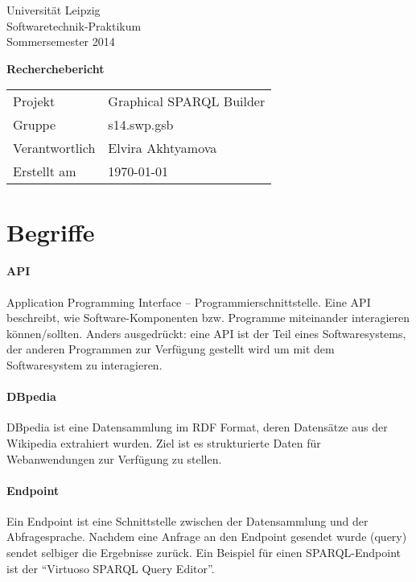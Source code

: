 \def\verantwortlicher{Elvira Akhtyamova} %
\thispagestyle{empty} 

\vspace*{2\baselineskip}

\begin{center}
\sffamily
Universität Leipzig\\
Softwaretechnik-Praktikum\\
Sommersemester 2014
\baselineskip

\bgroup
\Huge\textbf{Recherchebericht}
\egroup
{}\baselineskip

\begin{tabular}{ll}
Projekt & Graphical SPARQL Builder \\
Gruppe & s14.swp.gsb \\
Verantwortlich & \verantwortlicher\\
Erstellt am & \today \\
\end{tabular}
\end{center}

\vfill%

\tableofcontents

\pagebreak

\section{Begriffe}

\newcommand{\begriff}[2]{
\paragraph{#1}
#2
}


\begriff{API}
{Application Programming Interface -- Programmierschnittstelle.
Eine API beschreibt, wie Software-Komponenten bzw. Programme miteinander interagieren können/sollten. Anders ausgedrückt: eine API ist der Teil eines Softwaresystems, der anderen Programmen zur Verfügung gestellt wird um mit dem Softwaresystem zu interagieren.}

\begriff{DBpedia}
{DBpedia ist eine Datensammlung im RDF Format, deren Datensätze aus der Wikipedia extrahiert wurden. Ziel ist es strukturierte Daten für Webanwendungen zur Verfügung zu stellen.
\cite{dbpedia-wikipedia,dbpedia,dbpedia-datasets}
}

\begriff{Endpoint}
{Ein Endpoint ist eine Schnittstelle zwischen der Datensammlung und der 
Abfragesprache. Nachdem eine Anfrage an den Endpoint gesendet wurde (query)  sendet selbiger die Ergebnisse zurück. Ein Beispiel für einen SPARQL-Endpoint ist der “Virtuoso SPARQL Query Editor”. \cite{dbpedia-sparql}}

